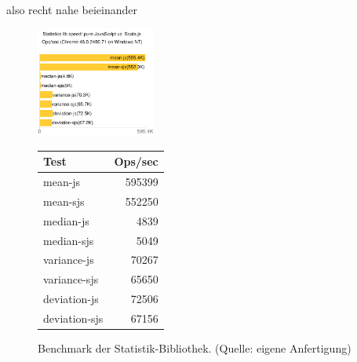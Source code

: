\documentclass[a4paper, 12pt, hidelinks, listof=totoc, listoftables=totoc, bibliography=totoc]{scrreprt}
\begin{document}
also recht nahe beieinander


\begin{figure}[!h]
	\centering
	\includegraphics[width=0.35\textwidth]{statistics-lib/benchmark-statistics-lib-chart}
	\qquad
	\qquad
	\begin{tabular}[b]{|l|r|}
		\hline \textbf{Test} & \textbf{Ops/sec} \\ 
		\hline mean-js       & 595399 \\ 
		\hline mean-sjs      & 552250 \\ 
		\hline median-js     & 4839 \\ 
		\hline median-sjs    & 5049 \\ 
		\hline variance-js   & 70267 \\ 
		\hline variance-sjs  & 65650 \\ 
		\hline deviation-js  & 72506 \\ 
		\hline deviation-sjs & 67156 \\ 
		\hline 
	\end{tabular}
	\captionsetup{labelformat=andtable}
	\caption{Benchmark der Statistik-Bibliothek. (Quelle: eigene Anfertigung)}
\end{figure}
\end{document}
